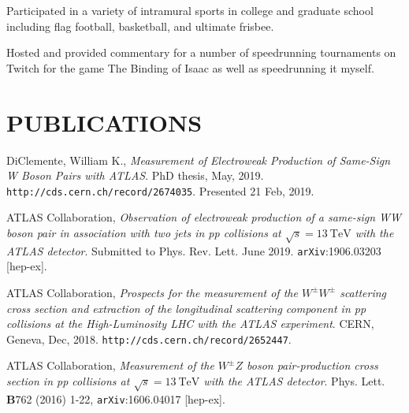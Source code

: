 \documentclass{res}
\begin{document}
\begin{resume}
   Participated in a variety of intramural sports in college and graduate school including flag football, basketball, and ultimate frisbee.

   Hosted and provided commentary for a number of speedrunning tournaments on Twitch for the game The Binding of Isaac as well as speedrunning it myself.

\section{PUBLICATIONS}
    DiClemente, William K., {\it Measurement of Electroweak Production of Same-Sign W Boson Pairs with ATLAS}.  PhD thesis, May, 2019. {\tt http://cds.cern.ch/record/2674035}. Presented 21 Feb, 2019.

    ATLAS Collaboration, {\it Observation of electroweak production of a same-sign WW boson pair in association with two jets in pp collisions at $\sqrt{s}=13~\textrm{TeV}$ with the ATLAS detector}. Submitted to Phys. Rev. Lett. June 2019. {\tt arXiv}:1906.03203 [hep-ex].

    ATLAS Collaboration, {\it Prospects for the measurement of the $W^{\pm}W^{\pm}$ scattering cross section and extraction of the longitudinal scattering component in pp collisions at the High-Luminosity LHC with the ATLAS experiment}. CERN, Geneva, Dec, 2018. {\tt http://cds.cern.ch/record/2652447}. %

    ATLAS Collaboration, {\it Measurement of the $W^{\pm}Z$ boson pair-production cross section in pp collisions at $\sqrt{s}=13~\textrm{TeV}$ with the ATLAS detector}. Phys. Lett. {\bf B}762 (2016) 1-22, {\tt arXiv}:1606.04017 [hep-ex].
 
 
 
\end{resume}
\end{document}
